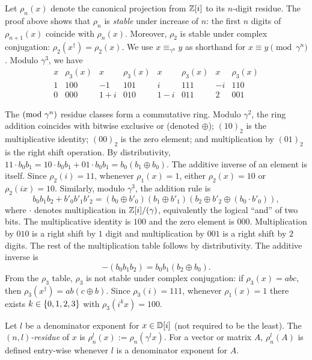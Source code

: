 \documentclass[reprint,amsmath,amssymb,aps,pra]{revtex4-2}
\begin{document}
Let $\rho_n(x)$ denote the canonical projection from $\mathbb{Z} [i]$ to its
$n$-digit residue. The proof above shows that $\rho_n$ is
\emph{stable} under increase of $n$: the first $n$ digits of
$\rho_{n+1}(x)$ coincide with $\rho_n(x)$. Moreover, $\rho_2$ is
stable under complex conjugation: $\rho_2(x^{\dagger}) =
\rho_2(x)$. We use $x \equiv_{\gamma^n} y$ as shorthand for
$x \equiv y \pmod{\gamma^n}$. Modulo $\gamma^3$, we have
\[
  \begin{array}{c|c|c|c|c|c|c|c}
    x & \rho_3(x) & x   & \rho_3(x) & x   & \rho_3(x) & x  & \rho_3(x) \\
    \hline
    1 & 100       & -1  & 101       & i   & 111       & -i & 110       \\
    0 & 000       & 1+i & 010       & 1-i & 011       & 2  & 001
  \end{array}
\]

The $(\mathrm{mod}\ \gamma ^ n)$ residue classes form a commutative ring. Modulo
$\gamma^2$, the ring addition coincides with bitwise exclusive or
(denoted $\oplus$); $(10)_2$ is the multiplicative identity; $(00)_2$
is the zero element; and multiplication by $(01)_2$ is the right shift
operation. By distributivity,
$11 \cdot b_0b_1 = 10 \cdot b_0b_1 + 01 \cdot b_0b_1 = b_0(b_1\oplus
b_0)$. The additive inverse of an element is itself. Since
$\rho_{2}(i) = 11$, whenever $\rho_1(x)=1$, either $\rho_2(x) = 10$ or
$\rho_2(ix) = 10$. Similarly, modulo $\gamma^3$, the addition rule is
\[
  b_0b_1b_2 + b'_0b'_1b'_2 = (b_0\oplus b'_0)(b_1\oplus
  b'_1)(b_2\oplus b'_2 \oplus (b_0 \cdot b'_0)),
\]
where $\cdot$ denotes multiplication in $\mathbb{Z}[i]/({\gamma})$,
equivalently the logical ``and'' of two bits. The multiplicative
identity is $100$ and the zero element is $000$. Multiplication by
$010$ is a right shift by $1$ digit and multiplication by $001$ is a
right shift by $2$ digits. The rest of the multiplication table
follows by distributivity. The additive inverse is
\[
  -(b_0b_1b_2) = b_0b_1(b_2\oplus b_0).
\]
From the $\rho_3$ table, $\rho_3$ is not stable under complex
conjugation: if $\rho_3(x) = abc$, then
$\rho_3(x^{\dagger}) = ab(c \oplus b)$. Since $\rho_3(i) = 111$,
whenever $\rho_1(x) = 1$ there exists $k \in \left\{0,1,2,3\right\}$ with
$\rho_3(i^k x) = 100$.

\begin{definition}
  Let $l$ be a denominator exponent for $x \in {\mathbb D} [i]$ (not required to
  be the least). The \emph{$(n,l)$-residue} of $x$ is
  $\rho_n^l(x) := \rho_n(\gamma^l x)$. For a vector or matrix $A$,
  $\rho_n^l(A)$ is defined entry-wise whenever $l$ is a denominator
  exponent for $A$.
\end{definition}
\end{document}

